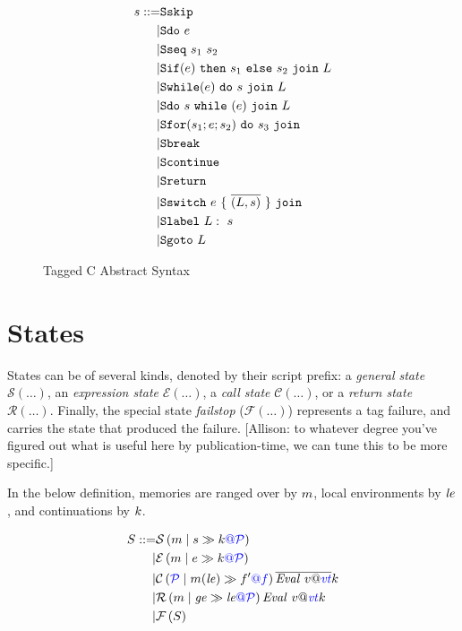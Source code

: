 \documentclass{llncs}
\begin{document}
\begin{figure}
  \begin{subfigure}[t]{0.3\textwidth}
    \[\begin{aligned}
    \stmt ::= & \sskip \\
    | & \sdo{\expr} \\
    | & \sseq{\stmt_1}{\stmt_2} \\
    | & \sifthenelse{\expr}{\stmt_1}{\stmt_2}{L} \\
    | & \swhile{\expr}{\stmt}{L} \\
    | & \sdowhile{\expr}{\stmt}{L} \\
    | & \sfor{\stmt_1}{\expr}{\stmt_2}{\stmt_3} \\
    | & \sbreak \\
    | & \scontinue \\
    | & \sreturn \\
    | & \sswitch{\expr}{\overline{(L,\stmt)}} \\
    | & \slabel{L}{\stmt} \\
    | & \sgoto{L} \\    
    \end{aligned}\]
  \end{subfigure}
  \begin{subfigure}[t]{0.69\textwidth}
  \end{subfigure}
  \caption{Tagged C Abstract Syntax}
  \label{fig:syntax}
\end{figure}

\section{States}

States can be of several kinds, denoted by their script prefix: a {\em general state} \(\mathcal{S}(\dots)\),
an {\em expression state} \(\mathcal{E}(\dots)\), a {\em call state} \(\mathcal{C}(\dots)\), or a
{\em return state} \(\mathcal{R}(\dots)\). Finally, the special state {\em failstop} (\(\mathcal{F}(\dots)\))
represents a tag failure, and carries the state that produced the failure.
[Allison: to whatever degree you've figured out what is useful here by publication-time, we can
  tune this to be more specific.]

In the below definition, memories are ranged over by \(\mem\), local environments by
\(\lenv\), and continuations by \(\cont\).

\[\begin{aligned}
S ::= & \sstate{\PCT}{\mem}{\stmt}{\cont} \\
| & \estate{\PCT}{\mem}{\expr}{\cont} \\
| & \cstate{f}{\PCT}{\mem}{\lenv}{f'}{\overline{\val{v}{\vt}}}{\cont} \\
| & \rstate{\PCT}{\mem}{\genv}{\lenv}{\val{v}{\vt}}{\cont} \\
| & \fstate{S} \\
\end{aligned}\]
\end{document}
